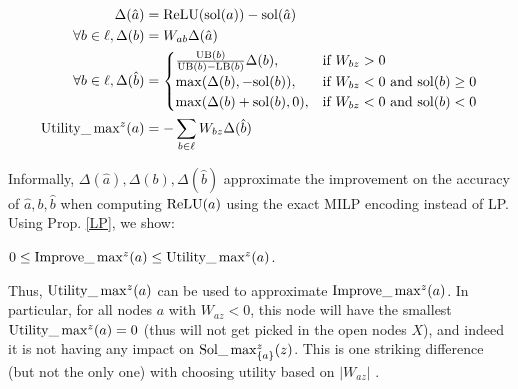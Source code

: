 {\begin{align*}
	\Delta(\hat{a}) &= \mathrm{ReLU}(\mathrm{sol}(a))-\mathrm{sol}(\hat{a})\\
	\forall b \in \ell, \Delta(b) &= W_{ab}\Delta(\hat{a})\\
	\forall b \in \ell, \Delta(\hat{b}) &=
	\begin{cases}
		\frac{\mathrm{UB}(b)}{\mathrm{UB}(b)-\mathrm{LB}(b)}\Delta(b),  &\text{if }W_{bz} > 0\\
		\max(\Delta(b),-\mathrm{sol}(b)),  &\text{if }  W_{bz} < 0 \text{ and } \mathrm{sol}(b)\geq0\\
		\max(\Delta(b)+\mathrm{sol}(b),0),  &\text{if }  W_{bz} < 0 \text{ and } \mathrm{sol}(b)<0		 
	\end{cases}\\
	\mathrm{Utility}\_\max\nolimits^z(a) &= -\sum_{b \in \ell} W_{bz} \Delta(\hat{b})
\end{align*}




Informally, $\Delta(\hat{a}), \Delta(b), \Delta(\hat{b})$ approximate the improvement on the accuracy of $\hat{a}, b, \hat{b}$ when computing $\mathrm{ReLU}(a)$ 
using the exact MILP encoding instead of LP. Using Prop. \ref{LP}, we show:

\begin{proposition}
	\label{prop2}
		$0 \leq \mathrm{Improve}\_\max^z(a) \leq \mathrm{Utility}\_\max^z(a)$. 
\end{proposition}



Thus, $\mathrm{Utility}\_\max^z(a)$ can be used to approximate $\mathrm{Improve}\_\max^z(a)$. 
In particular, for all nodes $a$ with $W_{az}< 0$,
this node will have the smallest $\mathrm{Utility}\_\max\nolimits^z(a)=0$ (thus will not get picked in the open nodes $X$), and indeed it is not having any impact on  $\mathrm{Sol}\_\max_{\{a\}}^z(z)$. This is one striking difference (but not the only one) with choosing utility based on 
$|W_{az}|$ \cite{DivideAndSlide}.

	
%	
	
}
